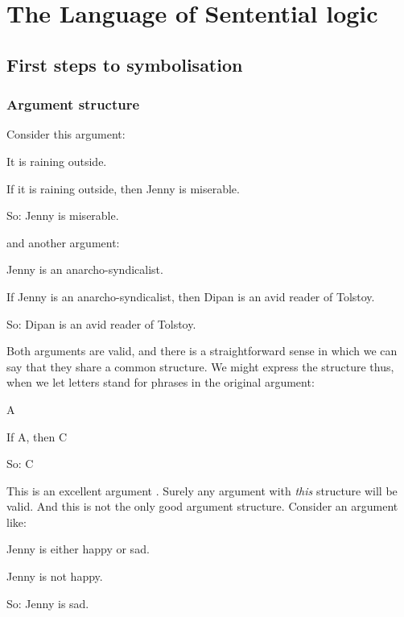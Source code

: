 \part{The Language of Sentential logic}
\label{ch.TFL}

\chapter{First steps to symbolisation}

\section{Argument structure}\label{s:ValidityInVirtueOfForm}
Consider this argument:
	\begin{earg}
		\item[] It is raining outside.
		\item[] \textsf{If} it is raining outside, \textsf{then} Jenny is miserable.
		\item[So:] Jenny is miserable.
	\end{earg}
and another argument:
	\begin{earg}
		\item[] Jenny is an anarcho-syndicalist.
		\item[] \textsf{If} Jenny is an anarcho-syndicalist, \textsf{then} Dipan is an avid reader of Tolstoy.
		\item[So:] Dipan is an avid reader of Tolstoy.
	\end{earg}
Both arguments are valid, and there is a straightforward sense in which we can say that they share a common structure. We might express the structure thus, when we let letters stand for phrases in the original argument:
	\begin{earg}
		\item[] A
		\item[] \textsf{If} A, \textsf{then} C
		\item[So:] C
	\end{earg}
This is an excellent argument . Surely any argument with \emph{this} structure will be valid. And this is not the only good argument structure. Consider an argument like:
	\begin{earg}
		\item[] Jenny is \textsf{either} happy \textsf{or} sad.
		\item[] Jenny is \textsf{not} happy.
		\item[So:] Jenny is sad.
	\end{earg}
